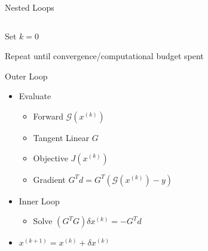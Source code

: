 \documentclass[10pt,aspectratio=169]{beamer}
\begin{document}
\begin{frame}{Nested Loops}
\begin{columns}
\begin{column}{.5\textwidth}
Set $k=0$

Repeat until convergence/computational budget spent

\alert{Outer Loop}
        \begin{itemize}
            \item Evaluate
            \begin{itemize}
            \item Forward $\mathcal{G}(x^{(k)})$ 
            \item Tangent Linear $G$
            \item Objective $J(x^{(k)})$
            \item Gradient $G^Td = G^T(\mathcal{G}(x^{(k)}) - y)$
            \end{itemize}
            \item \alert{Inner Loop}
            \begin{itemize}
                \item Solve $({G}^T{G}) \delta x^{(k)} = -{G}^Td$
            \end{itemize}
            \item $x^{(k+1)} = x^{(k)} + \delta x^{(k)}$
        \end{itemize}
\end{column}
\begin{column}{0.5\textwidth}
\end{column}
\end{columns}
\end{frame}
\end{document}

